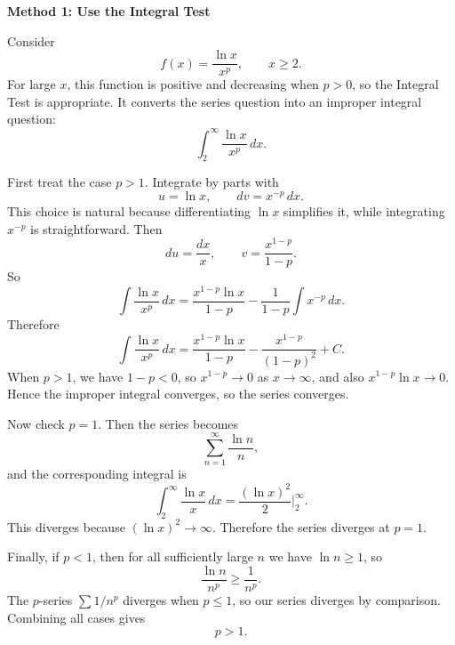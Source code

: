 \documentclass[a4paper,12pt,twocolumn]{article}
\newenvironment{solutionbox}{\begin{framed}}{\end{framed}}
\begin{document}
\begin{solutionbox}
\textbf{Method 1: Use the Integral Test}

\begin{steps}
\item Consider
\[
f(x)=\frac{\ln x}{x^p},\qquad x\ge 2.
\]
For large \(x\), this function is positive and decreasing when \(p>0\), so the Integral Test is appropriate. It converts the series question into an improper integral question:
\[
\int_2^\infty \frac{\ln x}{x^p}\,dx.
\]

\item First treat the case \(p>1\). Integrate by parts with
\[
u=\ln x,\qquad dv=x^{-p}\,dx.
\]
This choice is natural because differentiating \(\ln x\) simplifies it, while integrating \(x^{-p}\) is straightforward. Then
\[
du=\frac{dx}{x},
\qquad
v=\frac{x^{1-p}}{1-p}.
\]
So
\[
\int \frac{\ln x}{x^p}\,dx
=\frac{x^{1-p}\ln x}{1-p}-\frac{1}{1-p}\int x^{-p}\,dx.
\]
Therefore
\[
\int \frac{\ln x}{x^p}\,dx
=\frac{x^{1-p}\ln x}{1-p}-\frac{x^{1-p}}{(1-p)^2}+C.
\]
When \(p>1\), we have \(1-p<0\), so \(x^{1-p}\to 0\) as \(x\to\infty\), and also \(x^{1-p}\ln x\to 0\). Hence the improper integral converges, so the series converges.

\item Now check \(p=1\). Then the series becomes
\[
\sum_{n=1}^\infty \frac{\ln n}{n},
\]
and the corresponding integral is
\[
\int_2^\infty \frac{\ln x}{x}\,dx
=\frac{(\ln x)^2}{2}\Big|_2^\infty.
\]
This diverges because \((\ln x)^2\to\infty\). Therefore the series diverges at \(p=1\).

\item Finally, if \(p<1\), then for all sufficiently large \(n\) we have \(\ln n\ge 1\), so
\[
\frac{\ln n}{n^p}\ge \frac{1}{n^p}.
\]
The \(p\)-series \(\sum 1/n^p\) diverges when \(p\le 1\), so our series diverges by comparison. Combining all cases gives
\[
\boxed{p>1}.
\]
\end{steps}
\end{solutionbox}
\end{document}

